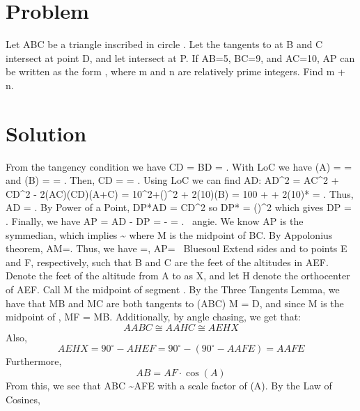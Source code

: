 \documentclass{article}%
\begin{document}
%
\normalsize%
\section*{Problem}%
Let \]ABC\] be a triangle inscribed in circle \]\omega\]. Let the tangents to \]\omega\] at \]B\] and \]C\] intersect at point \]D\], and let \]\] intersect \]\omega\] at \]P\]. If \]AB=5\], \]BC=9\], and \]AC=10\], \]AP\] can be written as the form \]\], where \]m\] and \]n\] are relatively prime integers. Find \]m + n\].%
\section*{Solution}%
From the tangency condition we have \]\let\angle BCD = \let\angle CBD = \let\angle A\]. With LoC we have \]\cos(A) =  = \] and \]\cos(B) =  = \]. Then, \]CD =  = \]. Using LoC we can find \]AD\]: \]AD^2 = AC^2 + CD^2 - 2(AC)(CD)\cos(A+C) = 10^2+()^2 + 2(10)\cos(B) = 100 +  + 2(10)* = \]. Thus, \]AD = \]. By Power of a Point, \]DP*AD = CD^2\] so \]DP* = ()^2\] which gives \]DP = \]. Finally, we have \]AP = AD - DP =  -  =  \].
~angie.
We know \]AP\] is the symmedian, which implies \]\sim {}\] where \]M\] is the midpoint of \]BC\]. By Appolonius theorem, \]AM=\]. Thus, we have \]=, AP=\]
~Bluesoul
Extend sides \]\] and \]\] to points \]E\] and \]F\], respectively, such that \]B\] and \]C\] are the feet of the altitudes in \]\triangle AEF\]. Denote the feet of the altitude from \]A\] to \]\] as \]X\], and let \]H\] denote the orthocenter of \]\triangle AEF\]. Call \]M\] the midpoint of segment \]\]. By the Three Tangents Lemma, we have that \]MB\] and \]MC\] are both tangents to \](ABC)\] \]\Rightarrow\] \]M = D\], and since \]M\] is the midpoint of \]\], \]MF = MB\]. Additionally, by angle chasing, we get that: 
\[\angle ABC \cong \angle AHC \cong \angle EHX\]
Also, 
\[\angle EHX = 90 ^\circ - \angle HEF = 90 ^\circ - (90 ^\circ - \angle AFE) = \angle AFE\] 
Furthermore, 
\[AB = AF \cdot \cos(A)\]
From this, we see that \]\triangle ABC \sim \triangle AFE\] with a scale factor of \]\cos(A)\]. By the Law of Cosines, 
\end{document}
